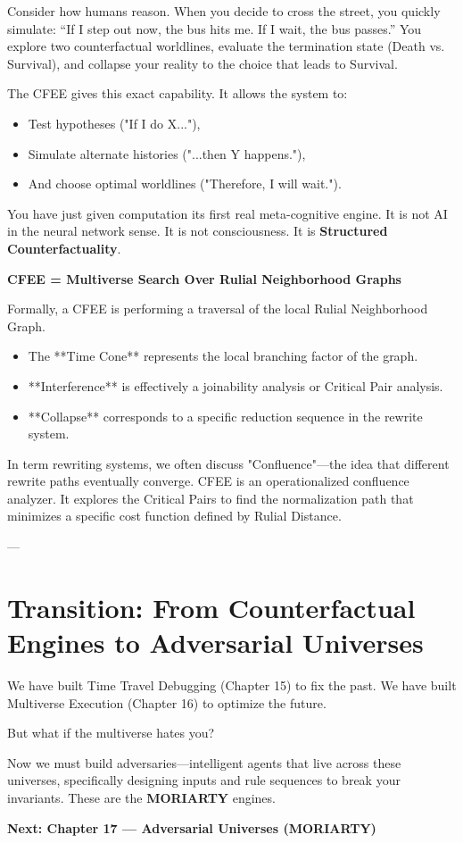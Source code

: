 Consider how humans reason. When you decide to cross the street, you quickly simulate: ``If I step out now, the bus hits me. If I wait, the bus passes.'' You explore two counterfactual worldlines, evaluate the termination state (Death vs. Survival), and collapse your reality to the choice that leads to Survival.

The CFEE gives \COMPUTER{} this exact capability. It allows the system to:
\begin{itemize}
    \item Test hypotheses ("If I do X..."),
    \item Simulate alternate histories ("...then Y happens."),
    \item And choose optimal worldlines ("Therefore, I will wait.").
\end{itemize}

You have just given computation its first real meta-cognitive engine. It is not AI in the neural network sense. It is not consciousness. It is \textbf{Structured Counterfactuality}.

\begin{nerdbox}
\textbf{CFEE = Multiverse Search Over Rulial Neighborhood Graphs}

Formally, a CFEE is performing a traversal of the local Rulial Neighborhood Graph.
\begin{itemize}
    \item The **Time Cone** represents the local branching factor of the graph.
    \item **Interference** is effectively a joinability analysis or Critical Pair analysis.
    \item **Collapse** corresponds to a specific reduction sequence in the rewrite system.
\end{itemize}
In term rewriting systems, we often discuss "Confluence"—the idea that different rewrite paths eventually converge. CFEE is an operationalized confluence analyzer. It explores the Critical Pairs to find the normalization path that minimizes a specific cost function defined by Rulial Distance.
\end{nerdbox}

---

\section{Transition: From Counterfactual Engines to Adversarial Universes}

We have built Time Travel Debugging (Chapter 15) to fix the past.
We have built Multiverse Execution (Chapter 16) to optimize the future.

But what if the multiverse hates you?

Now we must build adversaries—intelligent agents that live across these universes, specifically designing inputs and rule sequences to break your invariants. These are the \textbf{MORIARTY} engines.

\textbf{Next: Chapter 17 --- Adversarial Universes (MORIARTY)}
